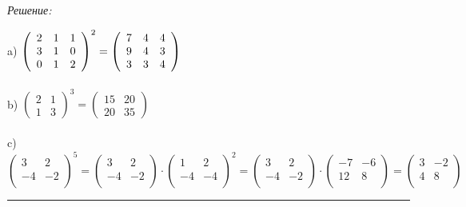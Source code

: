 \documentclass[a4paper, 12pt]{article}
\newenvironment{solution}
    {\textit{Решение: }}
    {\noindent\rule{7in}{1.5pt}}
\begin{document}
\begin{solution}

a)
$
\left(
\begin{array}{rrr}
2 & 1 & 1\\
3 & 1 & 0\\
0 & 1 & 2
\end{array}
\right)^2
=
\left(
\begin{array}{rrr}
7 & 4 & 4\\
9 & 4 & 3\\
3 & 3 & 4
\end{array}
\right)
\\
$
\\
\\
b)
$
\left(
\begin{array}{rr}
2 & 1 \\
1 & 3
\end{array}
\right)^3
=
\left(
\begin{array}{rr}
15 & 20 \\
20 & 35
\end{array}
\right)
$
\\
\\
c)
$
\left(
\begin{array}{rr}
3 & 2 \\
-4 & -2 \\
\end{array}
\right)^5
=
\left(
  \begin{array}{rr}
    3 & 2 \\
    -4 & -2 \\
  \end{array}
\right)
\cdot
\left(
  \begin{array}{rr}
    1 & 2 \\
    -4 & -4 \\
  \end{array}
\right)^2
=
\left(
  \begin{array}{rr}
    3 & 2 \\
    -4 & -2 \\
  \end{array}
\right)
\cdot
\left(
  \begin{array}{rr}
    -7 & -6 \\
    12 & 8 \\
  \end{array}
\right)
=
\left(
  \begin{array}{rr}
    3 & -2 \\
    4 & 8 \\
  \end{array}
\right)
$


\end{solution}
\end{document}

